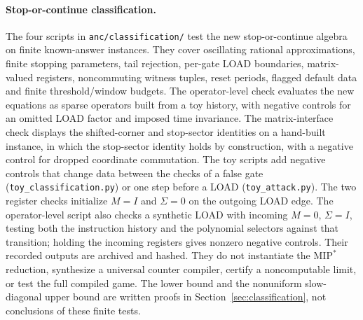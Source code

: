 \paragraph{Stop-or-continue classification.} The four scripts in \texttt{anc/classification/} test the new stop-or-continue algebra on finite known-answer instances. They cover oscillating rational approximations, finite stopping parameters, tail rejection, per-gate LOAD boundaries, matrix-valued registers, noncommuting witness tuples, reset periods, flagged default data and finite threshold/window budgets. The operator-level check evaluates the new equations as sparse operators built from a toy history, with negative controls for an omitted LOAD factor and imposed time invariance. The matrix-interface check displays the shifted-corner and stop-sector identities on a hand-built instance, in which the stop-sector identity holds by construction, with a negative control for dropped coordinate commutation. The toy scripts add negative controls that change data between the checks of a false gate (\texttt{toy\_classification.py}) or one step before a LOAD (\texttt{toy\_attack.py}). The two register checks initialize $M=I$ and $\Sigma=0$ on the outgoing LOAD edge. The operator-level script also checks a synthetic LOAD with incoming $M=0$, $\Sigma=I$, testing both the instruction history and the polynomial selectors against that transition; holding the incoming registers gives nonzero negative controls. Their recorded outputs are archived and hashed. They do not instantiate the $\mathrm{MIP}^*$ reduction, synthesize a universal counter compiler, certify a noncomputable limit, or test the full compiled game. The lower bound and the nonuniform slow-diagonal upper bound are written proofs in Section~\ref{sec:classification}, not conclusions of these finite tests.


